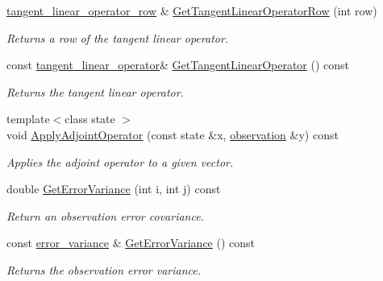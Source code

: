 \documentclass{tufte-book}
\begin{document}
\begin{DoxyCompactItemize}
\hyperlink{class_verdandi_1_1_observation_manager_template_a596a76a0e00b412f0b7cda4c7fb9d8f1}{tangent\-\_\-linear\-\_\-operator\-\_\-row} \& \hyperlink{class_verdandi_1_1_observation_manager_template_a4e00d5879ce62a7bdfe98246a52a3578}{\-Get\-Tangent\-Linear\-Operator\-Row} (int row)
\begin{DoxyCompactList}\small\item\em \-Returns a row of the tangent linear operator. \end{DoxyCompactList}\item
const \hyperlink{class_verdandi_1_1_observation_manager_template_a01c360118f7c08c34de9cf1a406e4405}{tangent\-\_\-linear\-\_\-operator}\& \hyperlink{class_verdandi_1_1_observation_manager_template_a3f1ed2e9299c80552a5ab85bbd94a2fd}{\-Get\-Tangent\-Linear\-Operator} () const
\begin{DoxyCompactList}\small\item\em \-Returns the tangent linear operator. \end{DoxyCompactList}\item
{\footnotesize template$<$class state $>$ }\\void \hyperlink{class_verdandi_1_1_observation_manager_template_a95a25d20e85f2466e6872d64a4e701df}{\-Apply\-Adjoint\-Operator} (const state \&x, \hyperlink{class_verdandi_1_1_observation_manager_template_ae5afff62ea0f6f0926e80467c6d14ec6}{observation} \&y) const
\begin{DoxyCompactList}\small\item\em \-Applies the adjoint operator to a given vector. \end{DoxyCompactList}\item
double \hyperlink{class_verdandi_1_1_observation_manager_template_a9b12be0175cf5fdb72df2b1e15bf5af2}{\-Get\-Error\-Variance} (int i, int j) const
\begin{DoxyCompactList}\small\item\em \-Return an observation error covariance. \end{DoxyCompactList}\item
const \hyperlink{class_verdandi_1_1_observation_manager_template_a6c945c41f11fb91cf83a2535b7516cc2}{error\-\_\-variance} \& \hyperlink{class_verdandi_1_1_observation_manager_template_a2fa3d5af9aaf77b23c7d88c3cf16034a}{\-Get\-Error\-Variance} () const
\begin{DoxyCompactList}\small\item\em \-Returns the observation error variance. \end{DoxyCompactList}\item

\end{DoxyCompactItemize}
\end{document}
